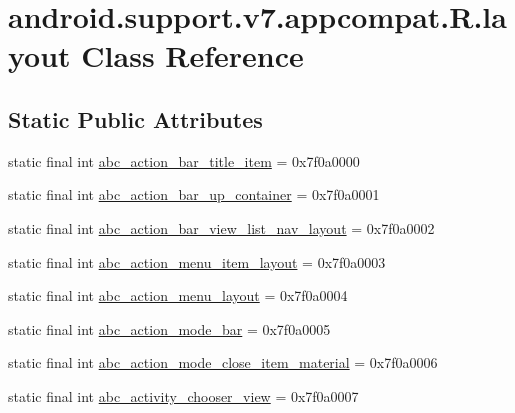 \hypertarget{classandroid_1_1support_1_1v7_1_1appcompat_1_1R_1_1layout}{}\section{android.\+support.\+v7.\+appcompat.\+R.\+layout Class Reference}
\label{classandroid_1_1support_1_1v7_1_1appcompat_1_1R_1_1layout}
\subsection*{Static Public Attributes}
\begin{DoxyCompactItemize}
\item 
static final int \mbox{\hyperlink{classandroid_1_1support_1_1v7_1_1appcompat_1_1R_1_1layout_aec65987e63e9073748bd15e578bfe898}{abc\+\_\+action\+\_\+bar\+\_\+title\+\_\+item}} = 0x7f0a0000
\item 
static final int \mbox{\hyperlink{classandroid_1_1support_1_1v7_1_1appcompat_1_1R_1_1layout_aef35fa753f14bda2de42d62e894d5d48}{abc\+\_\+action\+\_\+bar\+\_\+up\+\_\+container}} = 0x7f0a0001
\item 
static final int \mbox{\hyperlink{classandroid_1_1support_1_1v7_1_1appcompat_1_1R_1_1layout_ab2b3d6d1212d6aa5d21fd8d51a445bdd}{abc\+\_\+action\+\_\+bar\+\_\+view\+\_\+list\+\_\+nav\+\_\+layout}} = 0x7f0a0002
\item 
static final int \mbox{\hyperlink{classandroid_1_1support_1_1v7_1_1appcompat_1_1R_1_1layout_a90577c306263ff0ba660407c3bb14473}{abc\+\_\+action\+\_\+menu\+\_\+item\+\_\+layout}} = 0x7f0a0003
\item 
static final int \mbox{\hyperlink{classandroid_1_1support_1_1v7_1_1appcompat_1_1R_1_1layout_ae15076d5fd1b165883c87e6283dde5f9}{abc\+\_\+action\+\_\+menu\+\_\+layout}} = 0x7f0a0004
\item 
static final int \mbox{\hyperlink{classandroid_1_1support_1_1v7_1_1appcompat_1_1R_1_1layout_aec4f9e9f9a05a5ca2232a456cb5a6138}{abc\+\_\+action\+\_\+mode\+\_\+bar}} = 0x7f0a0005
\item 
static final int \mbox{\hyperlink{classandroid_1_1support_1_1v7_1_1appcompat_1_1R_1_1layout_a5ca5842a7ac8daaf24b3ac54dddca7ac}{abc\+\_\+action\+\_\+mode\+\_\+close\+\_\+item\+\_\+material}} = 0x7f0a0006
\item 
static final int \mbox{\hyperlink{classandroid_1_1support_1_1v7_1_1appcompat_1_1R_1_1layout_aee776be71fc6f95ebb7fc202d1653d33}{abc\+\_\+activity\+\_\+chooser\+\_\+view}} = 0x7f0a0007

\end{DoxyCompactItemize}
